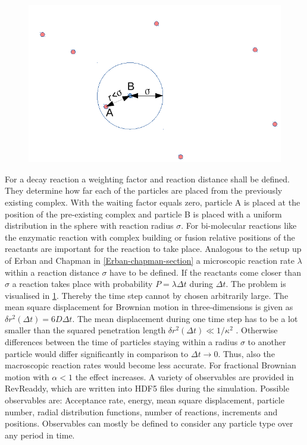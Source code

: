 \documentclass[
  a4paper,BCOR10mm,twoside,
  headsepline,footsepline,%
  fleqn,openbib
]{scrbook}
\begin{document}
\begin{figure} 
  \centering
  \includegraphics[width=0.7 \textwidth]{./data/schemeforreacions1.png}
  \captionsetup{width=\linewidth}
  \label{fig:model-reactions}
\end{figure}
\par
For a decay reaction a weighting factor and reaction distance shall be defined. They determine how far each of the particles are placed from the previously existing complex. With the waiting factor equals zero, particle A is placed at the position of the pre-existing complex and particle B is placed with a uniform distribution in the sphere with reaction radius $\sigma$. For bi-molecular reactions like the enzymatic reaction with complex building  or fusion  relative positions of the reactants are important for the reaction to take place. Analogous to the setup up of Erban and Chapman in \cref{Erban-chapman-section} a microscopic reaction rate $\lambda$ within a reaction distance $\sigma$ have to be defined. If the reactants come closer than $\sigma$ a reaction takes place with probability $P= \lambda \Delta t$ during $\Delta t$. The problem is visualised in \cref{fig:model-reactions}. Thereby the time step cannot by chosen arbitrarily large. The mean square displacement for Brownian motion in three-dimensions is given as $\delta r^2(\Delta t)= 6D \Delta t$. The mean displacement during one time step has to be a lot smaller than the squared penetration length $\delta r^2(\Delta t)\ll 1/\kappa^2$ . Otherwise differences between the time of particles staying within a radius $\sigma$ to another particle would differ significantly in comparison to $\Delta t \rightarrow 0$. Thus, also the macroscopic reaction rates would become less accurate. For fractional Brownian motion with $\alpha<1$ the effect increases. A variety of observables are provided in RevReaddy, which are written into HDF5 files \cite{hdf5} during the simulation. Possible observables are: Acceptance rate, energy, mean square displacement, particle number, radial distribution functions, number of reactions, increments and positions. Observables can mostly be defined to consider any particle type over any period in time. 
\end{document}
